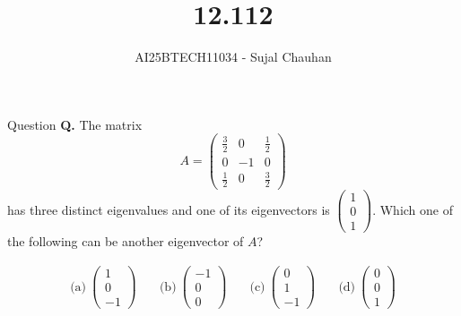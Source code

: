 \documentclass{beamer}
\title
{12.112}
\author 
{AI25BTECH11034 - Sujal Chauhan }
\begin{document}
\frame{\titlepage}
\begin{frame}{Question}
\textbf{Q.} The matrix
\[
A = \begin{pmatrix}
\frac{3}{2} & 0 & \frac{1}{2} \\
0 & -1 & 0 \\
\frac{1}{2} & 0 & \frac{3}{2}
\end{pmatrix}
\]
has three distinct eigenvalues and one of its eigenvectors is
\(
\begin{pmatrix}
1 \\ 0 \\ 1
\end{pmatrix}
\).
Which one of the following can be another eigenvector of $A$?

\[
\begin{array}{llll}
\text{(a)}~\begin{pmatrix} 1 \\ 0 \\ -1 \end{pmatrix} \quad &
\text{(b)}~\begin{pmatrix} -1 \\ 0 \\ 0 \end{pmatrix} \quad &
\text{(c)}~\begin{pmatrix} 0 \\ 1 \\ -1 \end{pmatrix} \quad &
\text{(d)}~\begin{pmatrix} 0\\ 0 \\ 1 \end{pmatrix}
\end{array}
\]


\end{frame}
\end{document}
